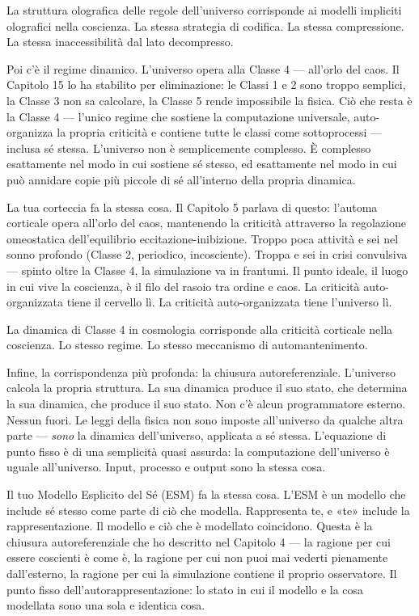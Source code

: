 \documentclass[11pt, twoside, openright]{book}
\begin{document}
La struttura olografica delle regole dell'universo corrisponde ai modelli impliciti olografici nella coscienza. La stessa strategia di codifica. La stessa compressione. La stessa inaccessibilità dal lato decompresso.

Poi c'è il regime dinamico. L'universo opera alla Classe 4 --- all'orlo del caos. Il Capitolo 15 lo ha stabilito per eliminazione: le Classi 1 e 2 sono troppo semplici, la Classe 3 non sa calcolare, la Classe 5 rende impossibile la fisica. Ciò che resta è la Classe 4 --- l'unico regime che sostiene la computazione universale, auto-organizza la propria criticità e contiene tutte le classi come sottoprocessi --- inclusa sé stessa. L'universo non è semplicemente complesso. È complesso esattamente nel modo in cui sostiene sé stesso, ed esattamente nel modo in cui può annidare copie più piccole di sé all'interno della propria dinamica.

La tua corteccia fa la stessa cosa. Il Capitolo 5 parlava di questo: l'automa corticale opera all'orlo del caos, mantenendo la criticità attraverso la regolazione omeostatica dell'equilibrio eccitazione-inibizione. Troppo poca attività e sei nel sonno profondo (Classe 2, periodico, incosciente). Troppa e sei in crisi convulsiva --- spinto oltre la Classe 4, la simulazione va in frantumi. Il punto ideale, il luogo in cui vive la coscienza, è il filo del rasoio tra ordine e caos. La criticità auto-organizzata tiene il cervello lì. La criticità auto-organizzata tiene l'universo lì.

La dinamica di Classe 4 in cosmologia corrisponde alla criticità corticale nella coscienza. Lo stesso regime. Lo stesso meccanismo di automantenimento.

Infine, la corrispondenza più profonda: la chiusura autoreferenziale. L'universo calcola la propria struttura. La sua dinamica produce il suo stato, che determina la sua dinamica, che produce il suo stato. Non c'è alcun programmatore esterno. Nessun fuori. Le leggi della fisica non sono imposte all'universo da qualche altra parte --- \textit{sono} la dinamica dell'universo, applicata a sé stessa. L'equazione di punto fisso è di una semplicità quasi assurda: la computazione dell'universo è uguale all'universo. Input, processo e output sono la stessa cosa.

Il tuo Modello Esplicito del Sé (ESM) fa la stessa cosa. L'ESM è un modello che include sé stesso come parte di ciò che modella. Rappresenta te, e «te» include la rappresentazione. Il modello e ciò che è modellato coincidono. Questa è la chiusura autoreferenziale che ho descritto nel Capitolo 4 --- la ragione per cui essere coscienti è come è, la ragione per cui non puoi mai vederti pienamente dall'esterno, la ragione per cui la simulazione contiene il proprio osservatore. Il punto fisso dell'autorappresentazione: lo stato in cui il modello e la cosa modellata sono una sola e identica cosa.
\end{document}
